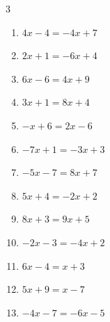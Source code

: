 \begin{multicols}{3}
\begin{enumerate}

\columnbreak %

\resetques

  \item $4x-4=-4x+7$


  \item $2x+1=-6x+4$


  \item $6x-6=4x+9$


  \item $3x+1=8x+4$


  \item $-x+6=2x-6$

        \phantom{$\displaystyle x=4$}

  \item $-7x+1=-3x+3$


  \item $-5x-7=8x+7$


  \item $5x+4=-2x+2$


  \item $8x+3=9x+5$

        \phantom{$\displaystyle x=-2$}

  \item $-2x-3=-4x+2$


  \item $6x-4=x+3$


  \item $5x+9=x-7$

        \phantom{$\displaystyle x=-4$}

  \item $-4x-7=-6x-5$

        \phantom{$\displaystyle x=1$}


\end{enumerate}
\end{multicols}
